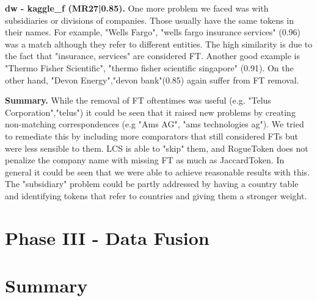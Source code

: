 \documentclass[11pt,titlepage,oneside,openany]{book}
\begin{document}
\textbf{dw - kaggle\_f (MR27|0.85). } One more problem we faced was with subsidiaries or divisions of companies. Those usually have the same tokens in their names. For example, "Wells Fargo", "wells fargo insurance services" (0.96) was a match although they refer to different entities. The high similarity is due to the fact that "insurance, services" are considered FT. Another good example is "Thermo Fisher Scientific", "thermo fisher scientific singapore" (0.91). On the other hand, "Devon Energy","devon bank"(0.85) again suffer from FT removal.

\textbf{Summary. }While the removal of FT oftentimes was useful (e.g. "Telus Corporation","telus") it could be seen that it raised new problems by creating non-matching correspondences (e.g "Ams AG", "ams technologies ag"). We tried to remediate this by including more comparators that still considered FTs but were less sensible to them. LCS is able to "skip" them, and RogueToken does not penalize the company name with missing FT as much as JaccardToken. In general it could be seen that we were able to achieve reasonable results with this. The "subsidiary" problem could be partly addressed by having a country table and identifying tokens that refer to countries and giving them a stronger weight.



\chapter{Phase III - Data Fusion}
\label{cha:data-fusion}



\chapter{Summary}
\end{document}
